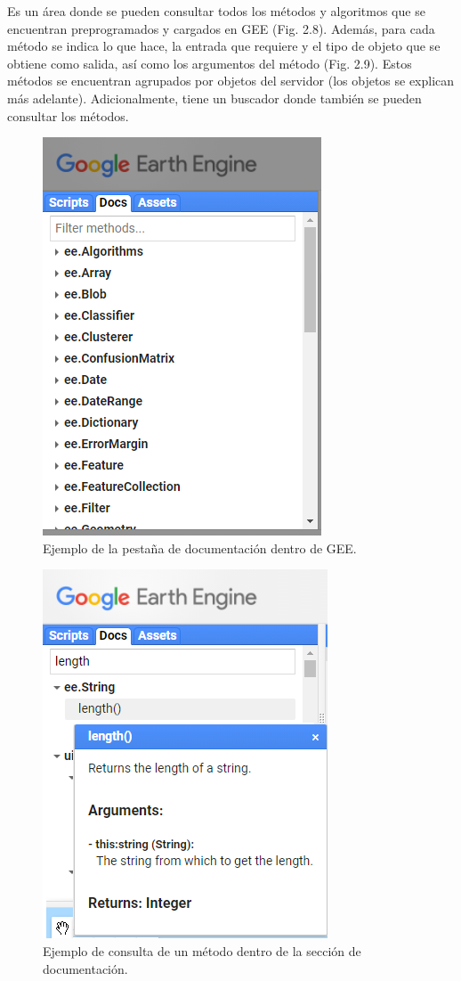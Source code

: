 \documentclass[
  12pt,
  letterpaper,
  twoside]{book}
\begin{document}
Es un área donde se pueden consultar todos los métodos y algoritmos que se encuentran preprogramados y cargados en GEE (Fig. 2.8). Además, para cada método se indica lo que hace, la entrada que requiere y el tipo de objeto que se obtiene como salida, así como los argumentos del método (Fig. 2.9). Estos métodos se encuentran agrupados por objetos del servidor (los objetos se explican más adelante). Adicionalmente, tiene un buscador donde también se pueden consultar los métodos.

\begin{figure}[btp]

{\centering \includegraphics[width=0.4\linewidth]{Img/docs} 

}

\caption{Ejemplo de la pestaña de documentación dentro de GEE.}\label{fig:unnamed-chunk-9}
\end{figure}

\begin{figure}[btp]

{\centering \includegraphics[width=0.4\linewidth]{Img/doc_ejemplo} 

}

\caption{Ejemplo de consulta de un método dentro de la sección de documentación.}\label{fig:unnamed-chunk-10}
\end{figure}
\end{document}
